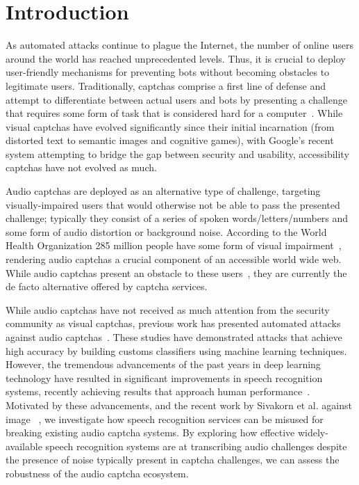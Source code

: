 \section{Introduction}
\label{sec:intro}

As automated attacks continue to plague the Internet,
the number of online users around the world has reached unprecedented levels.
Thus, it is crucial to deploy user-friendly mechanisms for preventing bots without
becoming obstacles to legitimate users. Traditionally, captchas comprise a first
line of defense and attempt to differentiate between actual users and bots by 
presenting a challenge that requires some form of task that is considered hard 
for a computer~\cite{captcha}. While visual captchas have evolved significantly 
since their initial incarnation (from distorted text to semantic images and cognitive games), 
with Google's recent \re system attempting to bridge the gap between security 
and usability, accessibility captchas have not evolved as much.

Audio captchas are deployed as an alternative type of challenge, targeting
visually-impaired users that would otherwise not be able to pass the presented
challenge; typically they consist of a series of spoken words/letters/numbers 
and some form of audio distortion or background noise.
According to the World Health Organization 285 million people have 
some form of visual impairment~\cite{impaired}, rendering audio captchas a
crucial component of an accessible world wide web. While audio captchas present
an obstacle to these users~\cite{sauer2008towards,bigham2008inspiring,bigham2009evaluating},
they are currently the de facto alternative offered by captcha services.

While audio captchas have not received as much attention from the security community as visual captchas,
previous work has presented automated attacks against audio captchas~\cite{Sano2013,Bursztein2009,
meutzner2014using,tam2009breaking,bursztein2011failure}. These studies have demonstrated attacks
that achieve high accuracy by building customs classifiers using machine learning techniques.
However, the tremendous advancements of the past years in deep learning technology have
resulted in significant improvements in speech recognition systems, recently achieving
results that approach human performance~\cite{ibm_blog,saon2017english}. Motivated
by these advancements, and the recent work by Sivakorn et al. against image 
\re~\cite{sivakorn:eurosp16}, we investigate how speech recognition services
can be misused for breaking existing audio captcha systems. By exploring how effective
widely-available speech recognition systems are at transcribing audio challenges despite 
the presence of noise typically present in captcha challenges, we can assess the robustness 
of the audio captcha ecosystem.

